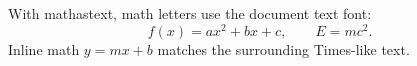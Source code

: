 \documentclass{article}
\begin{document}
With mathastext, math letters use the document text font:
\[
  f(x) = ax^2 + bx + c, \qquad E = mc^2.
\]
Inline math $y = mx + b$ matches the surrounding Times-like text.
\end{document}
